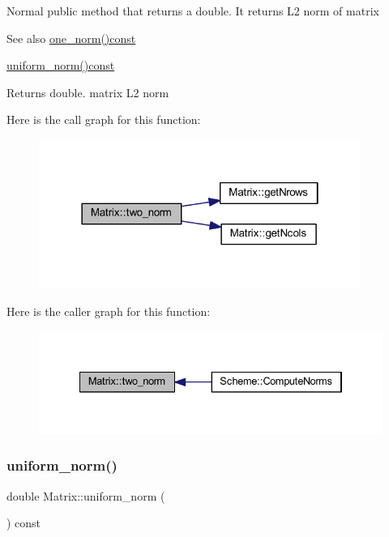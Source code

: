 Normal public method that returns a double. It returns L2 norm of matrix \begin{DoxySeeAlso}{See also}
\mbox{\hyperlink{class_matrix_af4d468252f3ecbbcaa5726c76e332b4c}{one\+\_\+norm()const}} 

\mbox{\hyperlink{class_matrix_a43066c7fe6418aad40170b85415063e8}{uniform\+\_\+norm()const}} 
\end{DoxySeeAlso}
\begin{DoxyReturn}{Returns}
double. matrix L2 norm 
\end{DoxyReturn}
Here is the call graph for this function\+:
\nopagebreak
\begin{figure}[H]
\begin{center}
\leavevmode
\includegraphics[width=298pt]{class_matrix_aac496af05ec7aa26afc2b9c6d0ab8b66_cgraph}
\end{center}
\end{figure}
Here is the caller graph for this function\+:
\nopagebreak
\begin{figure}[H]
\begin{center}
\leavevmode
\includegraphics[width=334pt]{class_matrix_aac496af05ec7aa26afc2b9c6d0ab8b66_icgraph}
\end{center}
\end{figure}
\mbox{\label{class_matrix_a43066c7fe6418aad40170b85415063e8}} 
\subsubsection{\texorpdfstring{uniform\+\_\+norm()}{uniform\_norm()}}
{\footnotesize\ttfamily double Matrix\+::uniform\+\_\+norm (\begin{DoxyParamCaption}{ }\end{DoxyParamCaption}) const}


